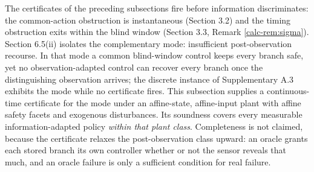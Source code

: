 \documentclass[10pt,twocolumn]{article}
\theoremstyle{definition}
\begin{document}
The certificates of the preceding subsections fire before information discriminates: the
common-action obstruction is instantaneous (Section 3.2) and the timing
obstruction exits within the blind window (Section 3.3, Remark
\ref{calc-rem:sigma}). Section 6.5(ii) isolates the complementary mode:
insufficient post-observation recourse. In that mode a common blind-window
control keeps every branch safe, yet no observation-adapted control can
recover every branch once the distinguishing observation arrives; the discrete
instance of Supplementary A.3 exhibits the mode while no certificate fires.
This subsection supplies a continuous-time certificate for the mode under
an affine-state, affine-input plant with affine safety facets and exogenous
disturbances. Its soundness covers every measurable information-adapted policy
\emph{within that plant class}. Completeness is
not claimed, because the certificate relaxes the post-observation class
upward: an oracle grants each stored branch its own controller whether or not
the sensor reveals that much, and an oracle failure is only a sufficient
condition for real failure.
\end{document}
